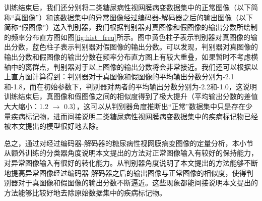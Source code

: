 训练结束后，我们还分别将二类糖尿病性视网膜病变数据集中的正常图像（以下简称“真图像”）和该数据集中的异常图像经过编码器-解码器之后的输出图像（以下简称“假图像”）送入判别器，我们根据判别器对真图像和假图像的输出分数所绘制的频率分布直方图如图\ref{fig:hist_freq}所示。图中黄色柱子表示判别器对真图像的输出分数，蓝色柱子表示判别器对假图像的输出分数。可以发现，判别器对真图像的输出分数和假图像的输出分数在频率分布直方图上有较大重叠，如果暂时不考虑横轴中的离群点，判别器对于以上图像的输出分数将会非常接近。我们还可以根据以上直方图计算得到：判别器对于真图像和假图像的平均输出分数分别为-2.1和-1.8，而在初始参数下，判别器对两者的平均输出分数分别为-2.2和-1.0，这说明训练结束后，真图像和假图像之间的相似度得到了极大提升（平均输出分数的差值大大缩小：1.2 $\rightarrow$ 0.3），这可以从判别器角度推断出“正常”数据集中只是存在少量疾病标记物，进而间接说明二类糖尿病性视网膜病变数据集中的疾病标记物已经被本文提出的模型很好地去除。

总之，通过对经过编码器-解码器的糖尿病性视网膜病变图像的定量分析，本小节从额外训练的分类器角度说明本文提出的方法对正常图像输入有较好的保持能力，对异常图像输入有很好的转化能力。从判别器角度说明了本文提出的方法能够不断地提高异常图像经过编码器-解码器之后的输出图像与正常图像的相似度，使得判别器对于真图像和假图像的输出分数不断逼近。这些现象都能间接说明本文提出的方法能够比较好地去除原始数据集中的疾病标记物。
